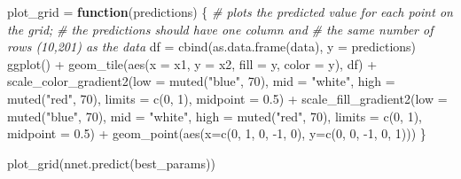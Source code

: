 \documentclass[
  a4paper,
]{article}
\newenvironment{Shaded}{\begin{snugshade}}{\end{snugshade}}
\newcommand{\AttributeTok}[1]{\textcolor[rgb]{0.77,0.63,0.00}{#1}}
\newcommand{\CommentTok}[1]{\textcolor[rgb]{0.56,0.35,0.01}{\textit{#1}}}
\newcommand{\ControlFlowTok}[1]{\textcolor[rgb]{0.13,0.29,0.53}{\textbf{#1}}}
\newcommand{\DecValTok}[1]{\textcolor[rgb]{0.00,0.00,0.81}{#1}}
\newcommand{\FloatTok}[1]{\textcolor[rgb]{0.00,0.00,0.81}{#1}}
\newcommand{\FunctionTok}[1]{\textcolor[rgb]{0.00,0.00,0.00}{#1}}
\newcommand{\NormalTok}[1]{#1}
\newcommand{\OtherTok}[1]{\textcolor[rgb]{0.56,0.35,0.01}{#1}}
\newcommand{\SpecialCharTok}[1]{\textcolor[rgb]{0.00,0.00,0.00}{#1}}
\newcommand{\StringTok}[1]{\textcolor[rgb]{0.31,0.60,0.02}{#1}}
\begin{document}
\begin{Shaded}
\begin{Highlighting}[]
\NormalTok{plot\_grid }\OtherTok{=} \ControlFlowTok{function}\NormalTok{(predictions) \{}
  \CommentTok{\# plots the predicted value for each point on the grid;}
  \CommentTok{\# the predictions should have one column and}
  \CommentTok{\# the same number of rows (10,201) as the data}
\NormalTok{  df }\OtherTok{=} \FunctionTok{cbind}\NormalTok{(}\FunctionTok{as.data.frame}\NormalTok{(data), }\AttributeTok{y =}\NormalTok{ predictions)}
  \FunctionTok{ggplot}\NormalTok{() }\SpecialCharTok{+}
    \FunctionTok{geom\_tile}\NormalTok{(}\FunctionTok{aes}\NormalTok{(}\AttributeTok{x =}\NormalTok{ x1, }\AttributeTok{y =}\NormalTok{ x2, }\AttributeTok{fill =}\NormalTok{ y, }\AttributeTok{color =}\NormalTok{ y), df) }\SpecialCharTok{+}
    \FunctionTok{scale\_color\_gradient2}\NormalTok{(}\AttributeTok{low =} \FunctionTok{muted}\NormalTok{(}\StringTok{"blue"}\NormalTok{, }\DecValTok{70}\NormalTok{), }\AttributeTok{mid =} \StringTok{"white"}\NormalTok{,}
                         \AttributeTok{high =} \FunctionTok{muted}\NormalTok{(}\StringTok{"red"}\NormalTok{, }\DecValTok{70}\NormalTok{), }\AttributeTok{limits =} \FunctionTok{c}\NormalTok{(}\DecValTok{0}\NormalTok{, }\DecValTok{1}\NormalTok{),}
                         \AttributeTok{midpoint =} \FloatTok{0.5}\NormalTok{) }\SpecialCharTok{+}
    \FunctionTok{scale\_fill\_gradient2}\NormalTok{(}\AttributeTok{low =} \FunctionTok{muted}\NormalTok{(}\StringTok{"blue"}\NormalTok{, }\DecValTok{70}\NormalTok{), }\AttributeTok{mid =} \StringTok{"white"}\NormalTok{,}
                        \AttributeTok{high =} \FunctionTok{muted}\NormalTok{(}\StringTok{"red"}\NormalTok{, }\DecValTok{70}\NormalTok{), }\AttributeTok{limits =} \FunctionTok{c}\NormalTok{(}\DecValTok{0}\NormalTok{, }\DecValTok{1}\NormalTok{),}
                        \AttributeTok{midpoint =} \FloatTok{0.5}\NormalTok{) }\SpecialCharTok{+}
    \FunctionTok{geom\_point}\NormalTok{(}\FunctionTok{aes}\NormalTok{(}\AttributeTok{x=}\FunctionTok{c}\NormalTok{(}\DecValTok{0}\NormalTok{, }\DecValTok{1}\NormalTok{, }\DecValTok{0}\NormalTok{, }\SpecialCharTok{{-}}\DecValTok{1}\NormalTok{, }\DecValTok{0}\NormalTok{), }\AttributeTok{y=}\FunctionTok{c}\NormalTok{(}\DecValTok{0}\NormalTok{, }\DecValTok{0}\NormalTok{, }\SpecialCharTok{{-}}\DecValTok{1}\NormalTok{, }\DecValTok{0}\NormalTok{, }\DecValTok{1}\NormalTok{)))}
\NormalTok{\}}

\FunctionTok{plot\_grid}\NormalTok{(}\FunctionTok{nnet.predict}\NormalTok{(best\_params))}
\end{Highlighting}
\end{Shaded}
\end{document}
